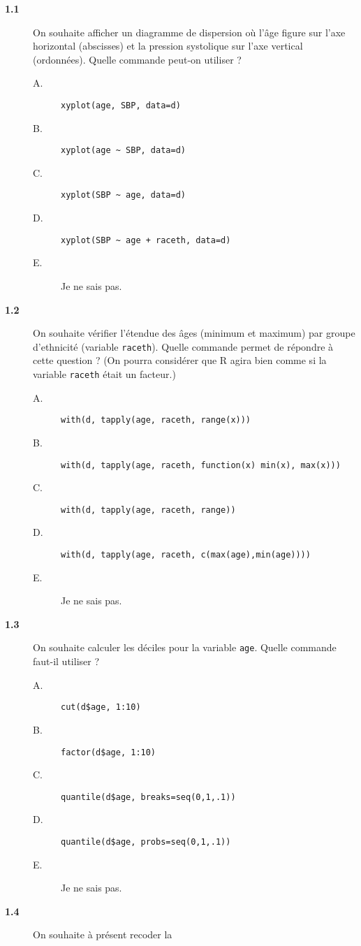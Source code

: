 \documentclass[11pt]{report}
\theoremstyle{definition}
\begin{document}
\begin{description}
\item[\bf 1.1]  On souhaite afficher un diagramme
  de dispersion où l'âge figure sur l'axe horizontal (abscisses) et la
  pression systolique sur l'axe vertical (ordonnées). Quelle commande
  peut-on utiliser ?
  \begin{description}
  \item[A.] \verb|xyplot(age, SBP, data=d)|
  \item[B.] \verb|xyplot(age ~ SBP, data=d)|
  \item[C.] \verb|xyplot(SBP ~ age, data=d)|
  \item[D.] \verb|xyplot(SBP ~ age + raceth, data=d)|
  \item[E.] Je ne sais pas.
  \end{description}
\item[\bf 1.2]  On souhaite vérifier l'étendue des
  âges (minimum et maximum) par groupe d'ethnicité (variable
  \texttt{raceth}). Quelle commande permet de répondre à cette question ?
  (On pourra considérer que R agira bien comme si la variable
  \texttt{raceth} était un facteur.)
  \begin{description}
  \item[A.] \verb|with(d, tapply(age, raceth, range(x)))|
  \item[B.] \verb|with(d, tapply(age, raceth, function(x) min(x), max(x)))|
  \item[C.] \verb|with(d, tapply(age, raceth, range))|
  \item[D.] \verb|with(d, tapply(age, raceth, c(max(age),min(age))))|
  \item[E.] Je ne sais pas.
  \end{description}
\item[\bf 1.3]  On souhaite calculer les déciles
  pour la variable \texttt{age}. Quelle commande faut-il utiliser ?
  \begin{description}
  \item[A.] \verb|cut(d$age, 1:10)|
  \item[B.] \verb|factor(d$age, 1:10)|
  \item[C.] \verb|quantile(d$age, breaks=seq(0,1,.1))|
  \item[D.] \verb|quantile(d$age, probs=seq(0,1,.1))|
  \item[E.] Je ne sais pas.
  \end{description}  
\item[\bf 1.4]  On souhaite à présent recoder la

\end{description}
\end{document}
